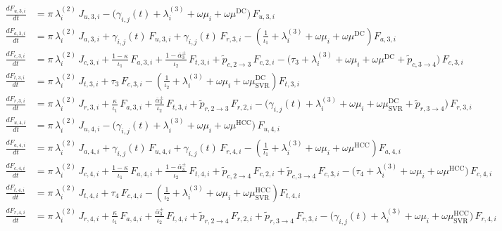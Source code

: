 \begin{align*}
\\[1.2em]
\frac{dF_{u,3,i}}{dt}
  &= \pi\,\lambda_i^{(2)}\,J_{u,3,i}
     - \bigl(\gamma_{i,j}(t) + \lambda_i^{(3)} + \omega\mu_i
             + \omega\mu^{\mathrm{DC}}\bigr)\,F_{u,3,i}
\\[0.8em]
\frac{dF_{a,3,i}}{dt}
  &= \pi\,\lambda_i^{(2)}\,J_{a,3,i}
     + \gamma_{i,j}(t)\,F_{u,3,i}
     + \gamma_{i,j}(t)\,F_{r,3,i}
     - \left(\frac{1}{\iota_1} + \lambda_i^{(3)} 
             + \omega\mu_i + \omega\mu^{\mathrm{DC}}\right)F_{a,3,i}
\\[0.8em]
\frac{dF_{c,3,i}}{dt}
  &= \pi\,\lambda_i^{(2)}\,J_{c,3,i}
     + \frac{1-\kappa}{\iota_1}\,F_{a,3,i}
     + \frac{1-\bar{\alpha}_3^{\pm}}{\iota_2}\,F_{t,3,i}
     + \tilde{p}_{c,2\to3}\,F_{c,2,i}
     - \bigl(\tau_3 + \lambda_i^{(3)} + \omega\mu_i + \omega\mu^{\mathrm{DC}}
             + \tilde{p}_{c,3\to4}\bigr)\,F_{c,3,i}
\\[0.8em]
\frac{dF_{t,3,i}}{dt}
  &= \pi\,\lambda_i^{(2)}\,J_{t,3,i}
     + \tau_3\,F_{c,3,i}
     - \left(\frac{1}{\iota_2} + \lambda_i^{(3)} 
             + \omega\mu_i + \omega\mu^{\mathrm{DC}}_{\mathrm{SVR}}\right)F_{t,3,i}
\\[0.8em]
\frac{dF_{r,3,i}}{dt}
  &= \pi\,\lambda_i^{(2)}\,J_{r,3,i}
     + \frac{\kappa}{\iota_1}\,F_{a,3,i}
     + \frac{\bar{\alpha}_3^{\pm}}{\iota_2}\,F_{t,3,i}
     + \tilde{p}_{r,2\to3}\,F_{r,2,i}
     - \bigl(\gamma_{i,j}(t) + \lambda_i^{(3)} + \omega\mu_i
             + \omega\mu^{\mathrm{DC}}_{\mathrm{SVR}}
             + \tilde{p}_{r,3\to4}\bigr)\,F_{r,3,i}
\\[1.2em]
\frac{dF_{u,4,i}}{dt}
  &= \pi\,\lambda_i^{(2)}\,J_{u,4,i}
     - \bigl(\gamma_{i,j}(t) + \lambda_i^{(3)} + \omega\mu_i + \omega\mu^{\mathrm{HCC}}\bigr)\,F_{u,4,i}
\\[0.8em]
\frac{dF_{a,4,i}}{dt}
  &= \pi\,\lambda_i^{(2)}\,J_{a,4,i}
     + \gamma_{i,j}(t)\,F_{u,4,i}
     + \gamma_{i,j}(t)\,F_{r,4,i}
     - \left(\frac{1}{\iota_1} + \lambda_i^{(3)} 
             + \omega\mu_i + \omega\mu^{\mathrm{HCC}}\right)F_{a,4,i}
\\[0.8em]
\frac{dF_{c,4,i}}{dt}
  &= \pi\,\lambda_i^{(2)}\,J_{c,4,i}
     + \frac{1-\kappa}{\iota_1}\,F_{a,4,i}
     + \frac{1-\bar{\alpha}_3^{\pm}}{\iota_2}\,F_{t,4,i}
     + \tilde{p}_{c,2\to4}\,F_{c,2,i}
     + \tilde{p}_{c,3\to4}\,F_{c,3,i}
     - \bigl(\tau_4 + \lambda_i^{(3)} + \omega\mu_i + \omega\mu^{\mathrm{HCC}}\bigr)\,F_{c,4,i}
\\[0.8em]
\frac{dF_{t,4,i}}{dt}
  &= \pi\,\lambda_i^{(2)}\,J_{t,4,i}
     + \tau_4\,F_{c,4,i}
     - \left(\frac{1}{\iota_2} + \lambda_i^{(3)} 
             + \omega\mu_i + \omega\mu^{\mathrm{HCC}}_{\mathrm{SVR}}\right)F_{t,4,i}
\\[0.8em]
\frac{dF_{r,4,i}}{dt}
  &= \pi\,\lambda_i^{(2)}\,J_{r,4,i}
     + \frac{\kappa}{\iota_1}\,F_{a,4,i}
     + \frac{\bar{\alpha}_3^{\pm}}{\iota_2}\,F_{t,4,i}
     + \tilde{p}_{r,2\to4}\,F_{r,2,i}
     + \tilde{p}_{r,3\to4}\,F_{r,3,i}
     - \bigl(\gamma_{i,j}(t) + \lambda_i^{(3)} + \omega\mu_i
             + \omega\mu^{\mathrm{HCC}}_{\mathrm{SVR}}\bigr)\,F_{r,4,i}
\end{align*}


